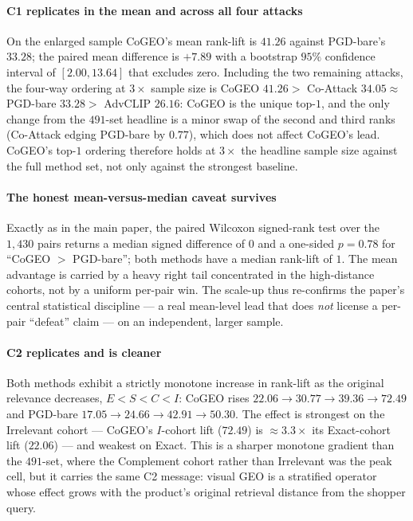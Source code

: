 \paragraph{C1 replicates in the mean and across all four attacks} On the enlarged sample CoGEO's mean rank-lift is $41.26$ against PGD-bare's $33.28$; the paired mean difference is $+7.89$ with a bootstrap $95\%$ confidence interval of $[2.00, 13.64]$ that excludes zero. Including the two remaining attacks, the four-way ordering at $3\times$ sample size is CoGEO $41.26 >$ Co-Attack $34.05 \approx$ PGD-bare $33.28 >$ AdvCLIP $26.16$: CoGEO is the unique top-$1$, and the only change from the $491$-set headline is a minor swap of the second and third ranks (Co-Attack edging PGD-bare by $0.77$), which does not affect CoGEO's lead. CoGEO's top-$1$ ordering therefore holds at $3\times$ the headline sample size against the full method set, not only against the strongest baseline.

\paragraph{The honest mean-versus-median caveat survives} Exactly as in the main paper, the paired Wilcoxon signed-rank test over the $1{,}430$ pairs returns a median signed difference of $0$ and a one-sided $p = 0.78$ for ``CoGEO $>$ PGD-bare''; both methods have a median rank-lift of $1$. The mean advantage is carried by a heavy right tail concentrated in the high-distance cohorts, not by a uniform per-pair win. The scale-up thus re-confirms the paper's central statistical discipline --- a real mean-level lead that does \emph{not} license a per-pair ``defeat'' claim --- on an independent, larger sample.

\paragraph{C2 replicates and is cleaner} Both methods exhibit a strictly monotone increase in rank-lift as the original relevance decreases, $E < S < C < I$: CoGEO rises $22.06 \to 30.77 \to 39.36 \to 72.49$ and PGD-bare $17.05 \to 24.66 \to 42.91 \to 50.30$. The effect is strongest on the Irrelevant cohort --- CoGEO's $I$-cohort lift ($72.49$) is $\approx 3.3\times$ its Exact-cohort lift ($22.06$) --- and weakest on Exact. This is a sharper monotone gradient than the $491$-set, where the Complement cohort rather than Irrelevant was the peak cell, but it carries the same C2 message: visual GEO is a stratified operator whose effect grows with the product's original retrieval distance from the shopper query.

